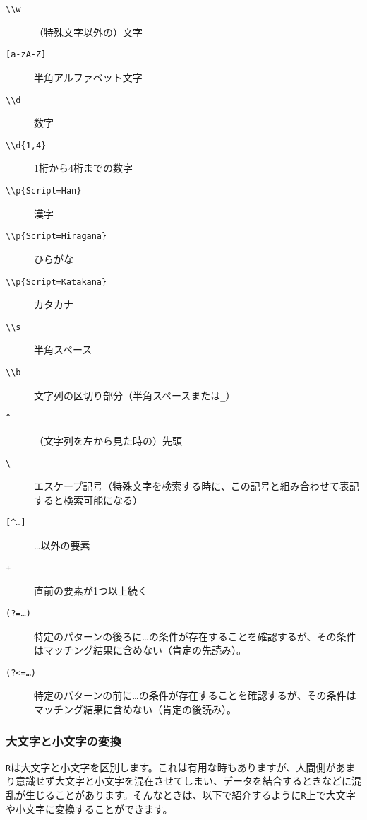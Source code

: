 \begin{description}
  \item[{\texttt{\textbackslash \textbackslash w}}]（特殊文字以外の）文字
  \item[\texttt{[a-zA-Z]}]半角アルファベット文字
  \item[\texttt{\textbackslash \textbackslash d}]数字
  \item[\texttt{\textbackslash \textbackslash d\{1,4\}}]1桁から4桁までの数字
  \item[\texttt{\textbackslash \textbackslash p\{Script=Han\}}]漢字
  \item[\texttt{\textbackslash \textbackslash p\{Script=Hiragana\}}]ひらがな
  \item[\texttt{\textbackslash \textbackslash p\{Script=Katakana\}}]カタカナ
  \item[{\texttt{\textbackslash \textbackslash s}}]半角スペース
  \item[\texttt{\textbackslash \textbackslash b}]文字列の区切り部分（半角スペースまたは\verb|_|）
  \item[\texttt{\^}]（文字列を左から見た時の）先頭
  \item[\texttt{\textbackslash}]エスケープ記号（特殊文字を検索する時に、この記号と組み合わせて表記すると検索可能になる）
  \item[{\texttt{[\string^\ldots]}}]\ldots 以外の要素
  \item[\texttt{+}]直前の要素が1つ以上続く
  \item[\texttt{(?=\ldots)}] 特定のパターンの後ろに\ldots の条件が存在することを確認するが、その条件はマッチング結果に含めない（肯定の先読み）。
  \item[\texttt{(?<=\ldots)}] 特定のパターンの前に\ldots の条件が存在することを確認するが、その条件はマッチング結果に含めない（肯定の後読み）。

\end{description}

    \subsubsection{大文字と小文字の変換}
\texttt{R}は大文字と小文字を区別します。これは有用な時もありますが、人間側があまり意識せず大文字と小文字を混在させてしまい、データを結合するときなどに混乱が生じることがあります。そんなときは、以下で紹介するように\texttt{R}上で大文字や小文字に変換することができます。

